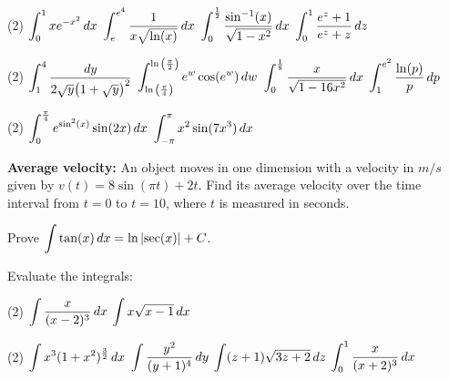 \documentclass[../mathNotesPreamble]{subfiles}
\begin{document}
  \begin{tasks}[after-item-skip=\stretch{1}, resume](2)
    \task $\ds\int_0^1 xe\inv[x^2]\,dx$
    \task $\ds\int_e^{e^4} \frac{1}{x\sqrt{\ln(x)}}\,dx$
    \task $\ds\int_0^{\frac{1}{2}} \frac{\sin\inv(x)}{\sqrt{1-x^2}}\,dx$
    \task $\ds\int_0^1 \frac{e^z+1}{e^z+z}\,dz$
  \end{tasks}
  \pagebreak
  
  \begin{tasks}[after-item-skip=\stretch{1}, resume](2)
    \task $\ds\int_1^4 \frac{dy}{2\sqrt{y}\parens{1+\sqrt{y}}^2}$
    \task $\ds\int_{\ln\parens{\frac{\pi}{4}}}^{\ln\parens{\frac{\pi}{2}}} e^w\cos(e^w)\,dw$
    \task $\ds\int_0^{\frac{1}{8}} \frac{x}{\sqrt{1-16x^2}}\,dx$
    \task $\ds\int_1^{e^2} \frac{\ln(p)}{p}\,dp$
  \end{tasks}
  \pagebreak
  
  \begin{tasks}[after-item-skip=\stretch{1}, resume](2)
    \task $\ds\int_0^{\frac{\pi}{4}} e^{\sin^2(x)}\sin(2x)\,dx$
    \task $\ds\int_{-\pi}^{\pi} x^2\sin(7x^3)\,dx$
  \end{tasks}
  \begin{ex*}
    \textbf{Average velocity:} An object moves in one dimension with a velocity in $m/s$ given by $v(t)=8\sin(\pi t)+2t$. Find its average velocity over the time interval from $t=0$ to $t=10$, where $t$ is measured in seconds.
  \end{ex*}
  \pagebreak
  
  \begin{ex*}
    Prove $\ds\int \tan(x)\,dx=\ln\abs{\sec(x)}+C$.
  \end{ex*}
  \begin{ex*}
    Evaluate the integrals:
  \end{ex*}
  \begin{tasks}[after-item-skip=\stretch{1}](2)
    \task $\ds\int \frac{x}{(x-2)^3}\,dx$
    \task $\ds\int x\sqrt{x-1}\,dx$
  \end{tasks}
  \pagebreak
  
  \begin{tasks}[after-item-skip=\stretch{1}, resume](2)
    \task $\ds\int x^3(1+x^2)^\frac{3}{2}\,dx$
    \task $\ds\int \frac{y^2}{(y+1)^4}\,dy$
    \task $\ds\int (z+1)\sqrt{3z+2}\,dz$
    \task $\ds\int_0^1 \frac{x}{(x+2)^3}\,dx$
  \end{tasks}
  \pagebreak
\end{document}
